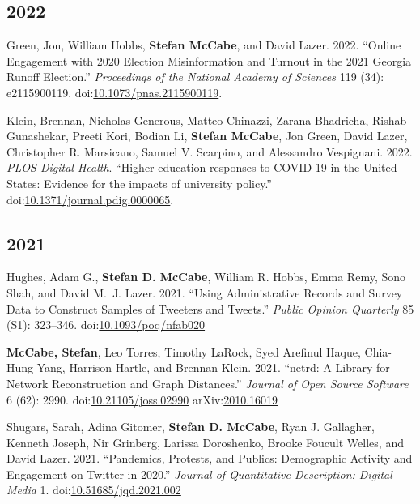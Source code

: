 \documentclass[11pt, letter]{article}
\begin{document}
\subsection{2022}
\begin{hangparas}{.25in}{1}
Green, Jon, William Hobbs, \textbf{Stefan McCabe}, and David Lazer. 2022. “Online Engagement with 2020 Election Misinformation and Turnout in the 2021 Georgia Runoff Election.” \textit{Proceedings of the National Academy of Sciences} 119 (34): e2115900119. doi:\href{https://doi.org/10.1073/pnas.2115900119}{10.1073/pnas.2115900119}.
\vspace{2mm}

Klein, Brennan, Nicholas Generous, Matteo Chinazzi, Zarana Bhadricha, Rishab Gunashekar, Preeti Kori, Bodian Li, \textbf{Stefan McCabe}, Jon Green, David Lazer, Christopher R. Marsicano, Samuel V. Scarpino, and Alessandro Vespignani. 2022. \textit{PLOS Digital Health}. ``Higher education responses to COVID-19 in the United States: Evidence for the impacts of university policy.'' doi:\href{https://doi.org/10.1371/journal.pdig.0000065}{10.1371/journal.pdig.0000065}.
\vspace{2mm}
\end{hangparas}


\subsection{2021}
\begin{hangparas}{.25in}{1}
Hughes, Adam G.,\textsuperscript{\textdagger} \textbf{Stefan D. McCabe},\textsuperscript{\textdagger} William R. Hobbs, Emma Remy, Sono Shah, and David M.~J. Lazer. 2021. ``Using Administrative Records and Survey Data to Construct Samples of Tweeters and Tweets.'' \textit{Public Opinion Quarterly} 85 (S1): 323--346. doi:\href{https://doi.org/10.1093/poq/nfab020}{10.1093/poq/nfab020}
\vspace{-1mm}

\textbf{McCabe, Stefan}, Leo Torres, Timothy LaRock, Syed Arefinul Haque, Chia-Hung Yang, Harrison Hartle, and Brennan Klein. 2021. ``netrd: A Library for Network Reconstruction and Graph Distances.'' \textit{Journal of Open Source Software} 6 (62): 2990. doi:\href{https://doi.org/10.21105/joss.02990}{10.21105/joss.02990} arXiv:\href{https://arxiv.org/abs/2010.16019}{2010.16019}
\vspace{-1mm}

Shugars, Sarah, Adina Gitomer, \textbf{Stefan D. McCabe}, Ryan J. Gallagher, Kenneth Joseph, Nir Grinberg, Larissa Doroshenko, Brooke Foucult Welles, and David Lazer. 2021. ``Pandemics, Protests, and Publics: Demographic Activity and Engagement on Twitter in 2020.'' \textit{Journal of Quantitative Description: Digital Media} 1. doi:\href{https://doi.org/10.51685/jqd.2021.002}{10.51685/jqd.2021.002}
\vspace{2mm}
\end{hangparas}
\end{document}
